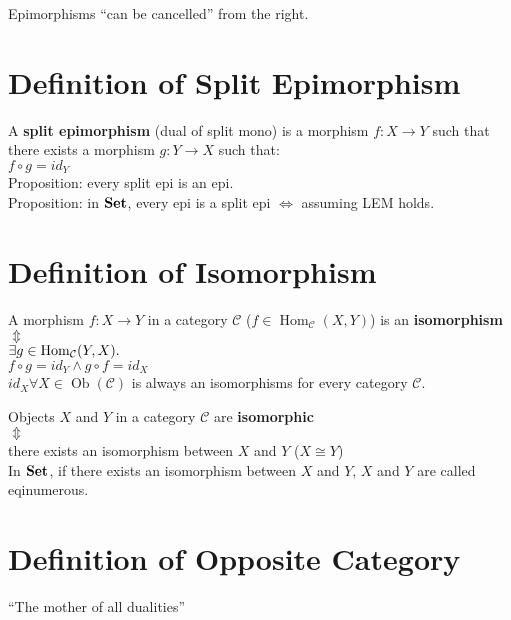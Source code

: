 \documentclass[a4paper, twoside, english, 11pt]{book}
\DeclareMathOperator{\Hom}{Hom}
\DeclareMathOperator{\Ob}{Ob}
\newcommand{\C}{\mathcal C}
\newcommand{\catname}[1]{{\normalfont\textbf{#1}}}
\newcommand{\Set}{\catname{Set}}
\begin{document}
\noindent
Epimorphisms ``can be cancelled'' from the right.



\section{Definition of Split Epimorphism}

A \textbf{split epimorphism} (dual of split mono) is a morphism $f : X \rightarrow Y$ such that there exists a morphism $g : Y \rightarrow X$ such that: \\

$f \circ g = id_Y$ \\

\noindent
Proposition: every split epi is an epi. \\
Proposition: in $\Set$, every epi is a split epi $\iff$ assuming LEM holds.



\section{Definition of Isomorphism}

A morphism $f : X \rightarrow Y$ in a category $\C$ ($f \in \Hom_\C(X, Y)$) is an \textbf{isomorphism} \\
\indent
$\Updownarrow$ \\ %
$\exists g \in \Hom_\C(Y, X) \ldotp$ \\
$f \circ g = id_Y \land g \circ f = id_X$ \\

\noindent
$id_X \forall X \in \Ob(\C)$ is always an isomorphisms for every category $\C$.

\noindent
Objects $X$ and $Y$ in a category $\C$ are \textbf{isomorphic} \\
\indent
$\Updownarrow$ \\ %
there exists an isomorphism between $X$ and $Y$ ($X \cong Y$) \\

\noindent
In $\Set$, if there exists an isomorphism between $X$ and $Y$, $X$ and $Y$ are called eqinumerous.



\section{Definition of Opposite Category}

``The mother of all dualities'' \\
\end{document}
